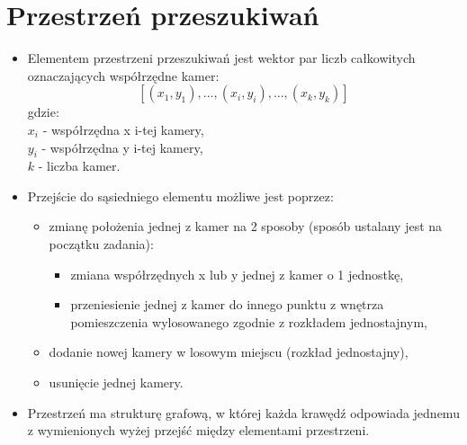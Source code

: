 \documentclass[12pt,a4paper]{article}
\begin{document}
\section{Przestrzeń przeszukiwań}
\begin{itemize}
	\item Elementem przestrzeni przeszukiwań jest wektor par liczb całkowitych oznaczających współrzędne kamer:\\
	$$[(x_1, y_1), ..., (x_i, y_i), ..., (x_k, y_k)]$$
	gdzie:\\
	$x_i$ - współrzędna x i-tej kamery,\\
	$y_i$ - współrzędna y i-tej kamery,\\
	$k$ - liczba kamer.
	\item Przejście do sąsiedniego elementu możliwe jest poprzez:
	\begin{itemize}
		\item zmianę położenia jednej z kamer na 2 sposoby (sposób
		ustalany jest na początku zadania):
		\begin{itemize}
		\item zmiana współrzędnych x lub y jednej z kamer o 1 jednostkę,
		\item przeniesienie jednej z kamer do innego punktu z wnętrza pomieszczenia
		wylosowanego zgodnie z rozkładem jednostajnym,
		\end{itemize}
		\item dodanie nowej kamery w losowym miejscu (rozkład jednostajny),
		\item usunięcie jednej kamery.
	\end{itemize}
	\item Przestrzeń ma strukturę grafową, w której każda krawędź odpowiada
	jednemu z wymienionych wyżej przejść między elementami przestrzeni.
\end{itemize}
\end{document}
